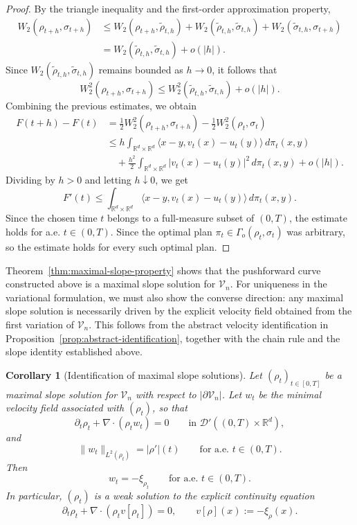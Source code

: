 \documentclass[11pt,reqno]{amsart}
\numberwithin{figure}{section}
\newcommand{\bbr}{\mathbb R}
\newcommand{\dm}{d}
\newtheorem{corollary}{Corollary}[section]
\begin{document}
\begin{proof}
By the triangle inequality and the first-order approximation property,
\[
\begin{aligned}
W_2(\rho_{t+h},\sigma_{t+h})
&\le
W_2(\rho_{t+h},\widetilde\rho_{t,h})
+
W_2(\widetilde\rho_{t,h},\widetilde\sigma_{t,h})
+
W_2(\widetilde\sigma_{t,h},\sigma_{t+h}) \\
&=
W_2(\widetilde\rho_{t,h},\widetilde\sigma_{t,h})
+
o(|h|).
\end{aligned}
\]
Since $W_2(\widetilde\rho_{t,h},\widetilde\sigma_{t,h})$ remains bounded as
$h\to0$, it follows that
\[
W_2^2(\rho_{t+h},\sigma_{t+h})
\le
W_2^2(\widetilde\rho_{t,h},\widetilde\sigma_{t,h})
+
o(|h|).
\]
Combining the previous estimates, we obtain
\[
\begin{aligned}
F(t+h)-F(t)
&=
\frac12W_2^2(\rho_{t+h},\sigma_{t+h})
-
\frac12W_2^2(\rho_t,\sigma_t) \\
&\le
h
\int_{\mathbb R^{d}\times\bbr^\dm}
\langle x-y,v_t(x)-u_t(y)\rangle
\,d\pi_t(x,y) \\
&\quad
+
\frac{h^2}{2}
\int_{\mathbb R^{d}\times\bbr^\dm}
|v_t(x)-u_t(y)|^2\,d\pi_t(x,y)
+
o(|h|).
\end{aligned}
\]
Dividing by $h>0$ and letting $h\downarrow0$, we get
\[
F'(t)
\le
\int_{\mathbb R^{d}\times\bbr^\dm}
\langle x-y,v_t(x)-u_t(y)\rangle
\,d\pi_t(x,y).
\]
Since the chosen time $t$ belongs to a full-measure subset of $(0,T)$, the
estimate holds for a.e. $t\in(0,T)$. Since the optimal plan $\pi_t\in
\Gamma_o(\rho_t,\sigma_t)$ was arbitrary, so the estimate holds for every
such optimal plan.
\end{proof}

Theorem~\ref{thm:maximal-slope-property} shows that the pushforward curve
constructed above is a maximal slope solution for $\mathcal V_n$. For uniqueness
in the variational formulation, we must also show the converse direction: any
maximal slope solution is necessarily driven by the explicit velocity field
obtained from the first variation of $\mathcal V_n$. This follows from the
abstract velocity identification in Proposition~\ref{prop:abstract-identification},
together with the chain rule and the slope identity established above.

\begin{corollary}[Identification of maximal slope solutions]
	\label{cor:maximal-slope-identification-Vn}
	Let $(\rho_t)_{t\in[0,T]}$ be a maximal slope solution for $\mathcal V_n$
	with respect to $|\partial \mathcal V_n|$. Let $w_t$ be the minimal velocity
	field associated with $(\rho_t)$, so that
	\[
	\partial_t\rho_t+\nabla\cdot(\rho_t w_t)=0
	\qquad\text{in }\mathcal D'((0,T)\times\mathbb R^d),
	\]
	and
	\[
	\|w_t\|_{L^2(\rho_t)}=|\rho'|(t)
	\qquad\text{for a.e. }t\in(0,T).
	\]
	Then
	\[
	w_t=-\xi_{\rho_t}
	\qquad\text{for a.e. }t\in(0,T).
	\]
	In particular, $(\rho_t)$ is a weak solution to the explicit continuity
	equation
	\[
	\partial_t\rho_t+\nabla\cdot(\rho_t v[\rho_t])=0,
	\qquad
	v[\rho](x):=-\xi_\rho(x).
	\]
\end{corollary}
\end{document}

